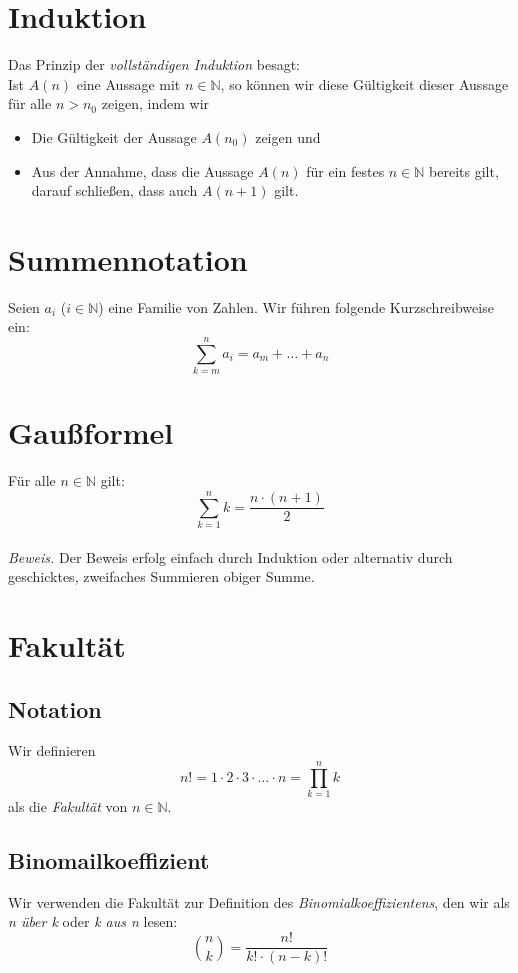 \documentclass{scrreprt}
\newenvironment{proof}{\emph{\\Beweis.}}{}
\newcommand{\NN}{\mathbb{N}}
\begin{document}
	\section{Induktion}
	Das Prinzip der \emph{vollständigen Induktion} besagt: \\
	Ist $A(n)$ eine Aussage mit $n \in \NN$, so können wir diese Gültigkeit dieser Aussage für alle $n > n_0$ zeigen, indem wir
	\begin{itemize}
		\item
			Die Gültigkeit der Aussage $A(n_0)$ zeigen und
		\item
			Aus der Annahme, dass die Aussage $A(n)$ für ein festes $n \in \NN$ bereits gilt, darauf schließen, dass auch $A(n + 1)$ gilt.
	\end{itemize}

	\section{Summennotation}
	Seien $a_i$ ($i \in \NN$) eine Familie von Zahlen. Wir führen folgende Kurzschreibweise ein:
	\begin{equation*}
		\sum\limits_{k=m}^n a_i = a_m + \dots + a_n
	\end{equation*}

	\section{Gaußformel}
	Für alle $n \in \NN$ gilt: 
	\begin{equation*}
			\sum\limits_{k=1}^n k = \frac{n \cdot (n + 1)}{2}
	\end{equation*}
	\begin{proof}
		Der Beweis erfolg einfach durch Induktion oder alternativ durch geschicktes, zweifaches Summieren obiger Summe.  
	\end{proof}

	\section{Fakultät}
		\subsection{Notation}
		Wir definieren
		\begin{equation*}
			n ! = 1 \cdot 2 \cdot 3 \cdot \dots \cdot n = \prod\limits_{k=1}^n k 
		\end{equation*}
		als die \emph{Fakultät} von $n \in \NN$.
		\subsection{Binomailkoeffizient}
		Wir verwenden die Fakultät zur Definition des \emph{Binomialkoeffizientens}, den wir als \emph{n über k} oder \emph{k aus n} lesen:
		\begin{equation*} 
			\binom{n}{k} = \frac{n!}{k! \cdot (n-k)!}
		\end{equation*}
\end{document}
